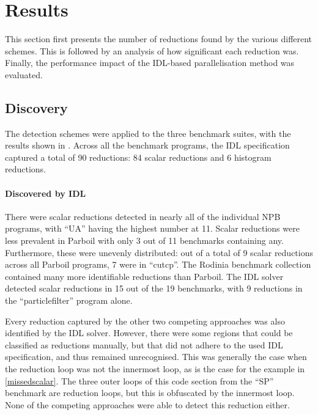 \section{Results}


    This section first presents the number of reductions found by the various
    different schemes.
    This is followed by an analysis of how significant each reduction was.
    Finally, the performance impact of the IDL-based parallelisation method was
    evaluated.
       
\subsection{Discovery}

    The detection schemes were applied to the three benchmark suites, with the
    results shown in . 
    Across all the benchmark programs, the IDL specification captured a total of
    90 reductions: 84 scalar reductions and 6 histogram reductions.

    \paragraph*{Discovered by IDL}
    There were scalar reductions detected in nearly all of the individual NPB
    programs, with ``UA'' having the highest number at 11.
    Scalar reductions were less prevalent in Parboil with only 3 out of 11
    benchmarks containing any.
    Furthermore, these were unevenly distributed: out of a total of 9 scalar
    reductions across all Parboil programs, 7 were in ``cutcp''.
    The Rodinia benchmark collection contained many more identifiable reductions
    than Parboil.
    The IDL solver detected scalar reductions in 15 out of the 19 benchmarks,
    with 9 reductions in the ``particlefilter'' program alone.

    Every reduction captured by the other two competing approaches was also
    identified by the IDL solver.
    However, there were some regions that could be classified as reductions
    manually, but that did not adhere to the used IDL specification, and thus
    remained unrecognised.
    This was generally the case when the reduction loop was not the innermost
    loop, as is the case for the example in \autoref{missedscalar}.
    The three outer loops of this code section from the ``SP'' benchmark are
    reduction loops, but this is obfuscated by the innermost loop.
    None of the competing approaches were able to detect this reduction either.

